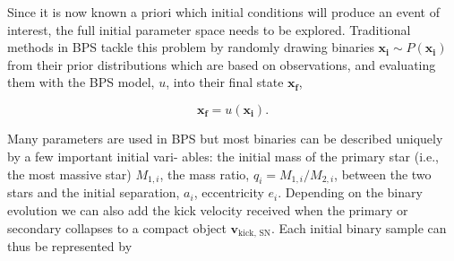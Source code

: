 \documentclass[a4paper,fleqn,usenatbib]{mnras}
\begin{document}
%
%
%
%
%

Since it is now known a priori which initial conditions will produce an event of interest, the full initial parameter space needs to be explored. Traditional methods in BPS tackle this problem by randomly drawing binaries $\mathbf{x_i} \sim P(\mathbf{x_i})$ from their prior distributions which are based on observations, and evaluating them with the BPS model, $u$,  into their final state $\mathbf{x_f}$, 

\begin{equation}
	\mathbf{x_f} = u(\mathbf{x_i}). 
\end{equation}  

Many parameters are used in BPS but most binaries can be described uniquely by a few important initial vari-
ables: the initial mass of the primary star (i.e., the most massive star) $M_{1,i}$, the mass ratio, $q_i = M_{1,i} / M_{2,i}$, between
the two stars and the initial separation, $a_i$, eccentricity $e_i$. Depending on the binary evolution we can also add the kick velocity received when the primary or secondary collapses to a compact object $\mathbf{v}_{\text{kick, SN}}$. Each initial binary sample can thus be represented by 
\end{document}
